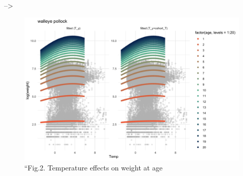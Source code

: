 \documentclass[
]{article}
\begin{document}
--\textgreater{}

\begin{figure}
\centering
\includegraphics{Figs/model_Temp_byage2.jpg}
\caption{``Fig.2. Temperature effects on weight at age}
\end{figure}
\end{document}
